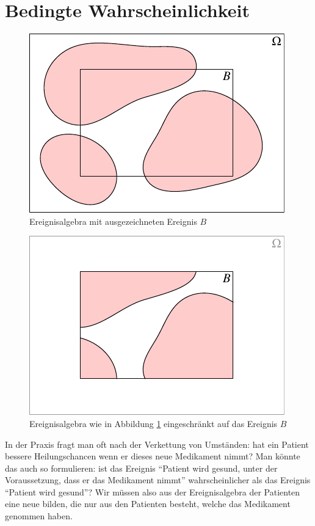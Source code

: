 \section{Bedingte Wahrscheinlichkeit}
\begin{figure}
\begin{center}
\includegraphics{images/algebra-1}
\end{center}
\caption{Ereignisalgebra mit ausgezeichneten Ereignis $B$\label{bedingt1}}
\end{figure}
\begin{figure}
\begin{center}
\includegraphics{images/algebra-2}
\end{center}
\caption{Ereignisalgebra wie in Abbildung \ref{bedingt1} eingeschränkt auf das Ereignis $B$\label{bedingt2}}
\end{figure}
In der Praxis fragt man oft nach der Verkettung von Umständen: hat ein
Patient bessere Heilungschancen wenn er dieses neue Medikament nimmt?
Man könnte das auch so formulieren: ist das Ereignis
``Patient wird gesund, unter der Voraussetzung, dass er das Medikament nimmt''
wahrscheinlicher als das Ereignis ``Patient wird gesund''? Wir müssen
also aus der Ereignis\-algebra der Patienten eine neue bilden, die nur
aus den Patienten besteht, welche das Medikament genommen haben.

